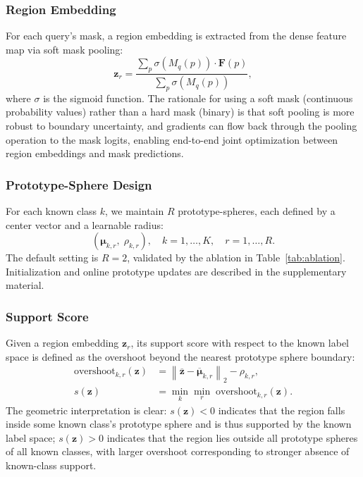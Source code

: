 \documentclass[journal]{IEEEtai}
\newcommand{\bF}{\mathbf{F}}
\newcommand{\bz}{\mathbf{z}}
\newcommand{\bmu}{\boldsymbol{\mu}}
\begin{document}
\subsubsection{Region Embedding}\label{sec:method:support:embed}

For each query's mask, a region embedding is extracted from the dense feature map
via soft mask pooling:
\begin{equation}\label{eq:mask_pool}
  \bz_r = \frac{\sum_{p} \sigma\!\left(M_q(p)\right) \cdot \bF(p)}{\sum_{p} \sigma\!\left(M_q(p)\right)},
\end{equation}
where $\sigma$ is the sigmoid function.
The rationale for using a soft mask (continuous probability values) rather than a
hard mask (binary) is that soft pooling is more robust to boundary uncertainty,
and gradients can flow back through the pooling operation to the mask logits,
enabling end-to-end joint optimization between region embeddings and mask predictions.

\subsubsection{Prototype-Sphere Design}\label{sec:method:support:sphere}

For each known class $k$, we maintain $R$ prototype-spheres, each defined by a
center vector and a learnable radius:
\begin{equation}\label{eq:proto_sphere}
  (\bmu_{k,r},\; \rho_{k,r}), \quad k = 1, \ldots, K, \quad r = 1, \ldots, R.
\end{equation}
The default setting is $R=2$, validated by the ablation in Table~\ref{tab:ablation}.
Initialization and online prototype updates are described in the supplementary material.

\subsubsection{Support Score}\label{sec:method:support:score}

Given a region embedding $\bz_r$, its support score with respect to the known label
space is defined as the overshoot beyond the nearest prototype sphere boundary:
\begin{align}
  \text{overshoot}_{k,r}(\bz) &= \left\|\overline{\bz} - \overline{\bmu}_{k,r}\right\|_2 - \rho_{k,r}, \label{eq:overshoot} \\
  s(\bz) &= \min_{k} \min_{r}\; \text{overshoot}_{k,r}(\bz). \label{eq:support_score}
\end{align}
The geometric interpretation is clear:
$s(\bz) < 0$ indicates that the region falls inside some known class's prototype sphere
and is thus supported by the known label space;
$s(\bz) > 0$ indicates that the region lies outside all prototype spheres of all known
classes, with larger overshoot corresponding to stronger absence of known-class support.
\end{document}
